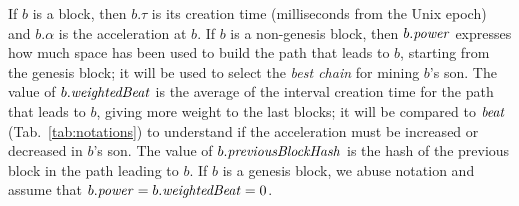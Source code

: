 %
If $b$ is a block, then $b.\tau$ is its creation time (milliseconds from the Unix epoch)
and $b.\alpha$ is the acceleration at $b$. If $b$ is a non-genesis block, then
$b.{\mathit{power}}$ expresses how much space has been used to build the path that leads to $b$,
starting from the genesis block; it will be used to select the \emph{best chain} for mining
$b$'s son. The value of $b.\mathit{weightedBeat}$ is the average of the interval creation time
for the path that leads to $b$, giving more weight to the last blocks; it will be
compared to ${\mathit{beat}}$ (Tab.~\ref{tab:notations}) to understand if the acceleration
must be increased or decreased in $b$'s son.
The value of $b.{\mathit{previousBlockHash}}$ is the hash of the previous block in the path leading to $b$.
If $b$ is a genesis block, we abuse notation and assume that $b.{\mathit{power}}=b.\mathit{weightedBeat}=0$.

